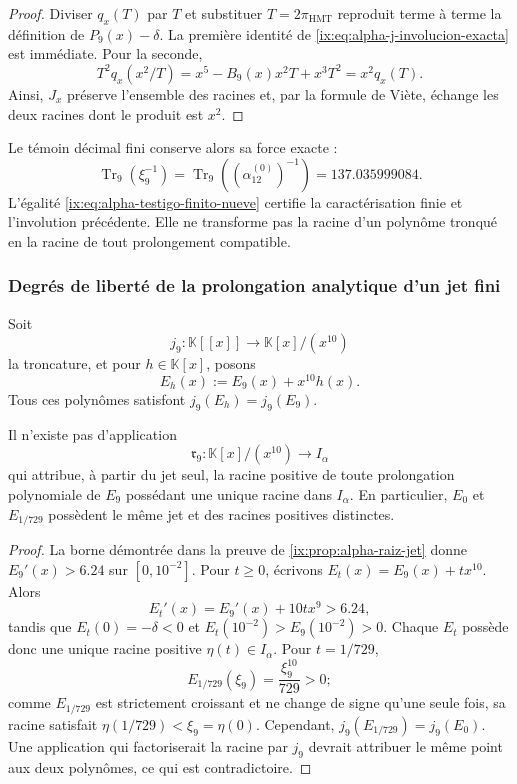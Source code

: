 \begin{proof}
Diviser \(q_x(T)\) par \(T\) et substituer \(T=2\pi_{\mathrm{HMT}}\) reproduit terme à terme la définition de \(P_9(x)-\delta\). La première identité de \eqref{ix:eq:alpha-j-involucion-exacta} est immédiate. Pour la seconde,
\[
 T^2q_x(x^2/T)
 =x^5-B_9(x)x^2T+x^3T^2=x^2q_x(T).
\]
Ainsi, \(J_x\) préserve l'ensemble des racines et, par la formule de Viète,
échange les deux racines dont le produit est \(x^2\).
\end{proof}

Le témoin décimal fini conserve alors sa force exacte :
\begin{equation}
 \operatorname{Tr}_9(\xi_9^{-1})
 =\operatorname{Tr}_9\!\left((\alpha_{12}^{(0)})^{-1}\right)
 =137.035999084.
 \label{ix:eq:alpha-testigo-finito-nueve}
\end{equation}
L'égalité \eqref{ix:eq:alpha-testigo-finito-nueve} certifie la caractérisation finie et l'involution précédente. Elle ne transforme pas la racine d'un polynôme tronqué en la racine de tout prolongement compatible.

\subsubsection{Degrés de liberté de la prolongation analytique d’un jet fini}

Soit
\[
 j_9:\mathbb K[[x]]\longrightarrow \mathbb K[x]/(x^{10})
\]
la troncature, et pour \(h\in\mathbb K[x]\), posons
\begin{equation}
 E_h(x):=E_9(x)+x^{10}h(x).
 \label{ix:eq:alpha-familia-prolongaciones-mismo-jet}
\end{equation}
Tous ces polynômes satisfont \(j_9(E_h)=j_9(E_9)\).

\begin{theorem}
\label{ix:thm:alpha-no-unicidad-prolongacion-jet}
Il n'existe pas d'application
\[
 \mathfrak r_9:\mathbb K[x]/(x^{10})\longrightarrow I_\alpha
\]
qui attribue, à partir du jet seul, la racine positive de toute
prolongation polynomiale de \(E_9\) possédant une unique racine dans
\(I_\alpha\). En particulier, \(E_0\) et \(E_{1/729}\) possèdent le même jet et
des racines positives distinctes.
\end{theorem}

\begin{proof}
La borne démontrée dans la preuve de
\ref{ix:prop:alpha-raiz-jet} donne \(E_9'(x)>6.24\) sur
\([0,10^{-2}]\). Pour \(t\geq0\), écrivons
\(E_t(x)=E_9(x)+tx^{10}\). Alors
\[
 E_t'(x)=E_9'(x)+10tx^9>6.24,
\]
tandis que \(E_t(0)=-\delta<0\) et \(E_t(10^{-2})>E_9(10^{-2})>0\). Chaque \(E_t\) possède donc une unique racine positive \(\eta(t)\in I_\alpha\). Pour \(t=1/729\),
\[
 E_{1/729}(\xi_9)=\frac{\xi_9^{10}}{729}>0;
\]
comme \(E_{1/729}\) est strictement croissant et ne change de signe qu'une seule
fois, sa racine satisfait \(\eta(1/729)<\xi_9=\eta(0)\). Cependant,
\(j_9(E_{1/729})=j_9(E_0)\). Une application qui factoriserait la racine par
\(j_9\) devrait attribuer le même point aux deux polynômes, ce qui est contradictoire.
\end{proof}

